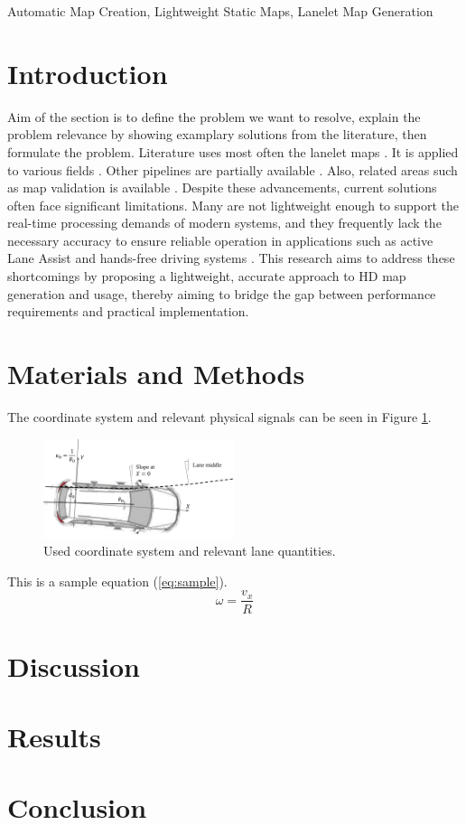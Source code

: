 \documentclass[conference]{IEEEtran}
\begin{document}
\begin{IEEEkeywords}
Automatic Map Creation, Lightweight Static Maps, Lanelet Map Generation
\end{IEEEkeywords}

\section{Introduction} \label{sec:introduction}
Aim of the section is to define the problem we want to resolve, explain the problem relevance by showing examplary solutions from the literature, then formulate the problem.
Literature uses most often the lanelet maps \cite{LaneletBasic}. It is applied to various fields \cite{laneletApplication}. Other pipelines are partially available \cite{PythonLanelet}. Also, related areas
such as map validation is available \cite{laneletValidation}. Despite these advancements, current solutions often face significant limitations. Many are not lightweight enough to support the real-time processing 
demands of modern systems, and they frequently lack the necessary accuracy to ensure 
reliable operation in applications such as active Lane Assist and hands-free 
driving systems \cite{HighwayLanelet}. This research aims to address these
shortcomings by proposing a lightweight, accurate approach to HD map 
generation and usage, thereby aiming to bridge the gap between performance requirements and
practical implementation.
 


\section{Materials and Methods} \label{sec:matAndMeths}
The coordinate system and relevant physical signals can be seen in Figure \ref{fig:coordinateSystem}.
\begin{figure}[h]
    \centering
    \includegraphics[width=0.5\textwidth]{laneDataAndVehicle.png}
    \caption{Used coordinate system and relevant lane quantities.}
    \label{fig:coordinateSystem}
\end{figure}
This is a sample equation (\ref{eq:sample}).
\begin{equation} \label{eq:sample}
    \omega = \frac{v_x}{R}
\end{equation}

\section{Discussion} \label{sec:discussion}

\section{Results} \label{sec:results}

\section{Conclusion} \label{sec:conclusion}

 
\end{document}
